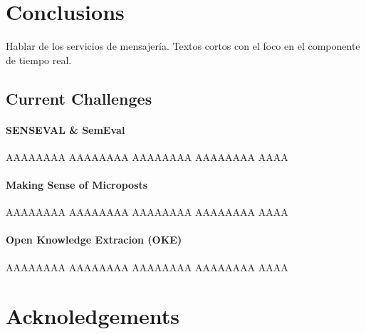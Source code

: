 \section{Conclusions}
\label{sec:conclusions}

{\color{red} Hablar de los servicios de mensajería. Textos cortos con el foco en el componente de tiempo real.}

\subsection{Current Challenges}

\paragraph{SENSEVAL \& SemEval}  AAAAAAAA AAAAAAAA AAAAAAAA AAAAAAAA AAAA

\paragraph{Making Sense of Microposts}  AAAAAAAA AAAAAAAA AAAAAAAA AAAAAAAA AAAA

\paragraph{Open Knowledge Extracion (OKE)}  AAAAAAAA AAAAAAAA AAAAAAAA AAAAAAAA AAAA

\section*{Acknoledgements}